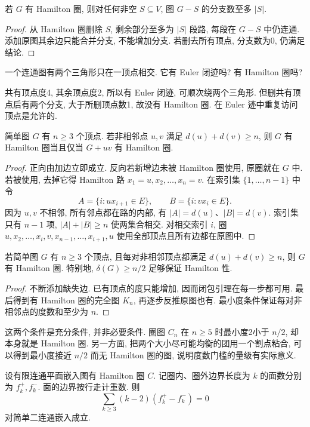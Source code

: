 \begin{proposition}\label{prop:ham-cut}
若 $G$ 有 Hamilton 圈, 则对任何非空 $S\subseteq V$, 图 $G-S$ 的分支数至多 $|S|$.
\end{proposition}
\begin{proof}
从 Hamilton 圈删除 $S$, 剩余部分至多为 $|S|$ 段路, 每段在 $G-S$ 中仍连通. 添加原图其余边只能合并分支, 不能增加分支. 若删去所有顶点, 分支数为0, 仍满足结论.
\end{proof}
\begin{example}
一个连通图有两个三角形只在一顶点相交. 它有 Euler 闭迹吗? 有 Hamilton 圈吗?
\end{example}
\begin{solution}
共有顶点度4, 其余顶点度2, 所以有 Euler 闭迹, 可顺次绕两个三角形. 但删共有顶点后有两个分支, 大于所删顶点数1, 故没有 Hamilton 圈. 在 Euler 迹中重复访问顶点是允许的.
\end{solution}
\begin{lemma}[闭包引理]\label{lem:closure}
简单图 $G$ 有 $n\ge3$ 个顶点. 若非相邻点 $u,v$ 满足 $d(u)+d(v)\ge n$, 则 $G$ 有 Hamilton 圈当且仅当 $G+uv$ 有 Hamilton 圈.
\end{lemma}
\begin{proof}
正向由加边立即成立. 反向若新增边未被 Hamilton 圈使用, 原圈就在 $G$ 中. 若被使用, 去掉它得 Hamilton 路 $x_1=u,x_2,\ldots,x_n=v$. 在索引集 $\{1,\ldots,n-1\}$ 中令
\[
A=\{i:ux_{i+1}\in E\},\qquad B=\{i:vx_i\in E\}.
\]
因为 $u,v$ 不相邻, 所有邻点都在路的内部, 有 $|A|=d(u)$、$|B|=d(v)$. 索引集只有 $n-1$ 项, $|A|+|B|\ge n$ 使两集合相交. 对相交索引 $i$, 圈 $u,x_2,\ldots,x_i,v,x_{n-1},\ldots,x_{i+1},u$ 使用全部顶点且所有边都在原图中.
\end{proof}
\begin{theorem}\label{thm:dirac}
若简单图 $G$ 有 $n\ge3$ 个顶点, 且每对非相邻顶点都满足 $d(u)+d(v)\ge n$, 则 $G$ 有 Hamilton 圈. 特别地, $\delta(G)\ge n/2$ 足够保证 Hamilton 性.
\end{theorem}
\begin{proof}
不断添加缺失边. 已有顶点的度只能增加, 因而闭包引理在每一步都可用. 最后得到有 Hamilton 圈的完全图 $K_n$, 再逐步反推原图也有. 最小度条件保证每对非相邻点的度数和至少为 $n$.
\end{proof}
这两个条件是充分条件, 并非必要条件. 圈图 $C_n$ 在 $n\ge5$ 时最小度2小于 $n/2$, 却本身就是 Hamilton 圈. 另一方面, 把两个大小尽可能均衡的团用一个割点粘合, 可以得到最小度接近 $n/2$ 而无 Hamilton 圈的图, 说明度数门槛的量级有实际意义.
\begin{theorem}[Grinberg 条件]\label{thm:grinberg}
设有限连通平面嵌入图有 Hamilton 圈 $C$. 记圈内、圈外边界长度为 $k$ 的面数分别为 $f_k^+,f_k^-$. 面的边界按行走计重数. 则
\[
\sum_{k\ge3}(k-2)(f_k^+-f_k^-)=0
\]
对简单二连通嵌入成立.
\end{theorem}
